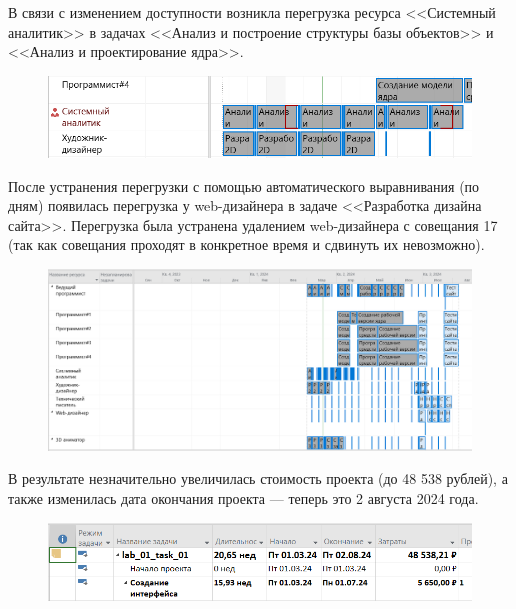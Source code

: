 \newpage

В связи с изменением доступности возникла перегрузка ресурса <<Системный аналитик>> в задачах <<Анализ и построение структуры базы объектов>> и <<Анализ и проектирование ядра>>.

\begin{figure}[h!]
	\begin{center}
		\includegraphics[scale=0.7]{inc/img/p_4.jpg}
	\end{center}
	\captionsetup{justification=centering}
	\label{fig:u3}
\end{figure}

После устранения перегрузки с помощью автоматического выравнивания (по дням) появилась перегрузка у web-дизайнера в задаче <<Разработка дизайна сайта>>. Перегрузка была устранена удалением web-дизайнера с совещания 17 (так как совещания проходят в конкретное время и сдвинуть их невозможно).

\begin{figure}[h!]
	\begin{center}
		\includegraphics[scale=0.4]{inc/img/p_5.png}
	\end{center}
	\captionsetup{justification=centering}
	\label{fig:u3}
\end{figure}

В результате незначительно увеличилась стоимость проекта (до 48 538 рублей), а также изменилась дата окончания проекта --- теперь это 2 августа 2024 года.

\begin{figure}[h!]
	\begin{center}
		\includegraphics[scale=0.6]{inc/img/p_6.png}
	\end{center}
	\captionsetup{justification=centering}
	\label{fig:u3}
\end{figure}

